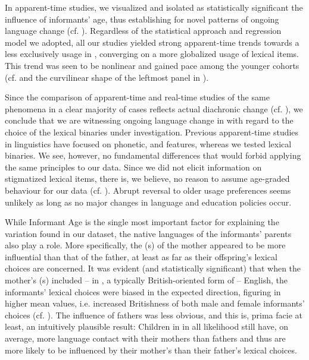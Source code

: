 \documentclass[output=paper]{langsci/langscibook}
\begin{document}
In apparent-time studies, we visualized and isolated as statistically significant the influence of informants’ age, thus establishing for  novel patterns of ongoing language change (cf. \citealt{Labov1990}). Regardless of the statistical approach and regression model we adopted, all our studies yielded strong apparent-time trends towards a less exclusively  usage in , converging on a more globalized usage of lexical items. This trend was seen to be nonlinear and gained pace among the younger cohorts (cf.  and the curvilinear shape of the leftmost panel in ). 

Since the comparison of apparent-time and real-time studies of the same phenomena in a clear majority of cases reflects actual diachronic change (cf. \citealt{Cukor-AvilaBailey2013}), we conclude that we are witnessing ongoing language change in  with regard to the choice of the lexical binaries under investigation. Previous apparent-time studies in linguistics have focused on phonetic,  and  features, whereas we tested lexical binaries. We see, however, no fundamental differences that would forbid applying the same principles to our data. Since we did not elicit information on stigmatized lexical items, there is, we believe, no reason to assume age-graded behaviour for our data (cf. \citealt[98-112]{Labov1994}). Abrupt reversal to older usage preferences seems unlikely as long as no major changes in language and education policies occur.

While Informant Age is the single most important factor for explaining the variation found in our dataset, the native languages of the informants’ parents also play a role. More specifically, the (s) of the mother appeared to be more influential than that of the father, at least as far as their offspring’s lexical choices are concerned. It was evident (and statistically significant) that when the mother’s (s) included – in , a typically British-oriented form of – English, the informants’ lexical choices were biased in the expected direction, figuring in higher mean values, i.e. increased Britishness of both male and female informants’ choices (cf. ). The influence of fathers was less obvious, and this is, prima facie at least, an intuitively plausible result: Children in  in all likelihood still have, on average, more language contact with their mothers than fathers and thus are more likely to be influenced by their mother’s than their father’s lexical choices.
\end{document}
